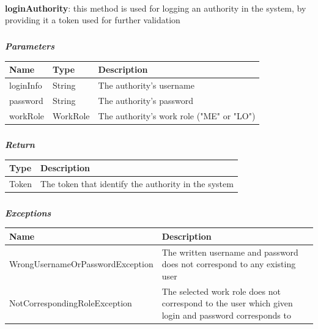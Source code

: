 					\paragraph{}
							\textbf{loginAuthority}: this method is used for logging an authority in the system, by providing it a token used for further validation
							\subparagraph{}
							\vspace{-3mm}
							\textit{\textbf{Parameters}}
							\vspace{-2mm}
								\begin{table}[!h]
									\begin{tabular}{L{0.2\textwidth}L{0.15\textwidth}L{0.45\textwidth}}
										\toprule
										\textbf{Name} & \textbf{Type} & \textbf{Description} \\
										\midrule
								  		loginInfo & String & The authority's username \\
								  		password & String & The authority's password \\
								  		workRole & WorkRole & The authority's work role ("ME" or "LO") \\
								 		\bottomrule
									\end{tabular}
								\end{table}
							\clearpage
							\subparagraph{}
								\textit{\textbf{Return}}
								\vspace{-2mm}
									\begin{table}[!h]
									\begin{tabular}{L{0.2\textwidth}L{0.6\textwidth}}
										\toprule
										\textbf{Type} & \textbf{Description} \\
										\midrule
								  		Token & The token that identify the authority in the system \\
								 		\bottomrule
									\end{tabular}
								\end{table}
							\subparagraph{}
							\vspace{-6mm}
								\textit{\textbf{Exceptions}}
								\vspace{-2mm}
									\begin{table}[!h]
									\begin{tabular}{L{0.5\textwidth}L{0.3\textwidth}}
										\toprule
										\textbf{Name} & \textbf{Description} \\
										\midrule
								  	WrongUsernameOrPasswordException & The written username and password does not correspond to any existing user \\
								  	NotCorrespondingRoleException & The selected work role does not correspond to the user which given login and password corresponds to \\
								 		\bottomrule
									\end{tabular}
								\end{table}

